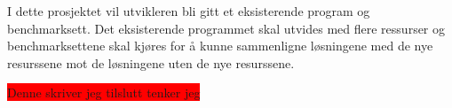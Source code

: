 I dette prosjektet vil utvikleren bli gitt et eksisterende \ilog program og benchmarksett. Det eksisterende \ilog programmet skal utvides med flere ressurser og benchmarksettene skal kjøres for å kunne sammenligne løsningene med de nye resurssene mot de løsningene uten de nye resurssene.

\colorbox{red}{Denne skriver jeg tilslutt tenker jeg}